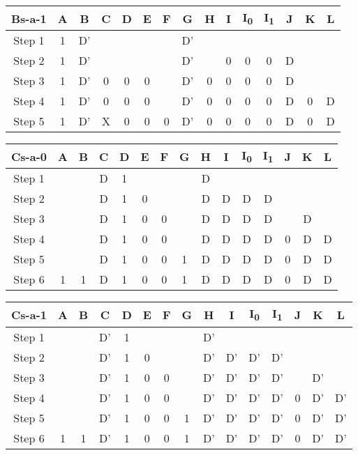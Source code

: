 \documentclass[11pt]{report}
\begin{document}
\begin{tabular}{ |c||c|c|c|c|c|c|c|c|c|c|c|c|c|c| }
\hline
\bf Bs-a-1 & \bf A & \bf B & \bf C & \bf D & \bf E & \bf F & G & H & I & I\textsubscript{0} & I\textsubscript{1} & J & K & \bf L \\
\hline
\hline
Step 1 & 1 & D' & & & & & D' & & & & & & & \\
\hline
Step 2 & 1 & D' & & & & & D' & & 0 & 0 & 0 & D & & \\
\hline
Step 3 & 1 & D' & 0 & 0 & 0 & & D' & 0 & 0 & 0 & 0 & D & & \\
\hline
Step 4 & 1 & D' & 0 & 0 & 0 & & D' & 0 & 0 & 0 & 0 & D & 0 & D \\
\hline
Step 5 & 1 & D' & X & 0 & 0 & 0 & D' & 0 & 0 & 0 & 0 & D & 0 & D \\
\hline
\end{tabular}




\begin{tabular}{ |c||c|c|c|c|c|c|c|c|c|c|c|c|c|c| }
\hline
\bf Cs-a-0 & \bf A & \bf B & \bf C & \bf D & \bf E & \bf F & G & H & I & I\textsubscript{0} & I\textsubscript{1} & J & K & \bf L \\
\hline
\hline
Step 1 & & & D & 1 & & & & D & & & & & & \\
\hline
Step 2 & & & D & 1 & 0 & & & D & D & D & D & & & \\
\hline
Step 3 & & & D & 1 & 0 & 0 & & D & D & D & D & & D & \\
\hline
Step 4 & & & D & 1 & 0 & 0 & & D & D & D & D & 0 & D & D \\
\hline
Step 5 & & & D & 1 & 0 & 0 & 1 & D & D & D & D & 0 & D & D \\
\hline
Step 6 & 1 & 1 & D & 1 & 0 & 0 & 1 & D & D & D & D & 0 & D & D \\
\hline
\end{tabular}




\begin{tabular}{ |c||c|c|c|c|c|c|c|c|c|c|c|c|c|c| }
\hline
\bf Cs-a-1 & \bf A & \bf B & \bf C & \bf D & \bf E & \bf F & G & H & I & I\textsubscript{0} & I\textsubscript{1} & J & K & \bf L \\
\hline
\hline
Step 1 & & & D' & 1 & & & & D' & & & & & & \\
\hline
Step 2 & & & D' & 1 & 0 & & & D' & D' & D' & D' & & & \\
\hline
Step 3 & & & D' & 1 & 0 & 0 & & D' & D' & D' & D' & & D' & \\
\hline
Step 4 & & & D' & 1 & 0 & 0 & & D' & D' & D' & D' & 0 & D' & D' \\
\hline
Step 5 & & & D' & 1 & 0 & 0 & 1 & D' & D' & D' & D' & 0 & D' & D' \\
\hline
Step 6 & 1 & 1 & D' & 1 & 0 & 0 & 1 & D' & D' & D' & D' & 0 & D' & D' \\
\hline
\end{tabular}
\end{document}
